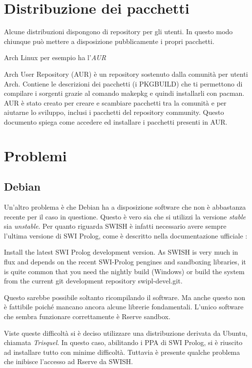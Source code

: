 \documentclass[10pt,titlepage,twoside,a4paper]{report}
\begin{document}
\section{Distribuzione dei pacchetti}
Alcune distribuzioni dispongono di repository per gli utenti. In questo modo 
chiunque può mettere a disposizione pubblicamente i propri pacchetti.

Arch Linux per esempio ha l'\emph{AUR}\cite{aur}
\begin{displayquote}
Arch User Repository (AUR) è un repository sostenuto dalla comunità per utenti 
Arch. Contiene le descrizioni dei pacchetti (i PKGBUILD) che ti permettono di 
compilare i sorgenti grazie al comando makepkg e quindi installarli con pacman. 
AUR è stato creato per creare e scambiare pacchetti tra la comunità e per 
aiutarne lo sviluppo, inclusi i pacchetti del repository community. Questo 
documento spiega come accedere ed installare i pacchetti presenti in AUR. 
\end{displayquote}


\section{Problemi} \label{sec:problemi}
\subsection{Debian}
Un'altro problema è che Debian ha a disposizione software che non è
abbastanza recente per il caso in questione. Questo è vero sia che si 
utilizzi la versione \emph{stable} sia \emph{unstable}. Per quanto riguarda 
SWISH è infatti necessario avere sempre l'ultima versione di SWI Prolog,
come è descritto nella documentazione ufficiale \cite{lastestSWIProlog}:
\begin{displayquote}
Install the latest  SWI Prolog development version. As SWISH is very much in 
flux and depends on the recent SWI-Prolog pengines and sandboxing libraries, 
it is quite common that you need the nightly build (Windows) or build the 
system from the current git development repository swipl-devel.git.
\end{displayquote}

Questo sarebbe possibile  soltanto ricompilando il software. Ma anche questo 
non è fattibile poiché mancano ancora alcune librerie fondamentali. L'unico 
software che sembra funzionare correttamente è Rserve sandbox.

Viste queste difficoltà si è deciso utilizzare una distribuzione derivata 
da Ubuntu, chiamata \emph{Trisquel}. In questo caso, abilitando i PPA di SWI 
Prolog\cite{SWIPrologPPA}, si è riuscito ad installare tutto con minime 
difficoltà. Tuttavia è presente qualche problema che inibisce l'accesso ad 
Rserve da SWISH.
\end{document}

